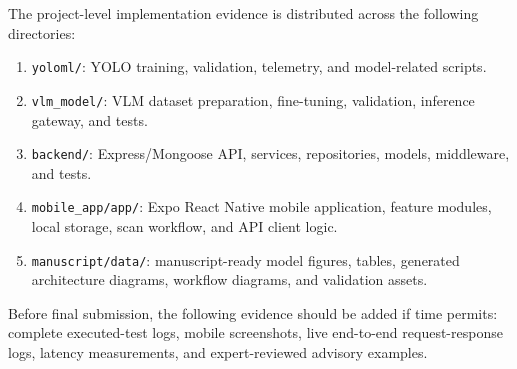 The project-level implementation evidence is distributed across the following directories:

\begin{enumerate}[label=\arabic*.]
\item \texttt{yoloml/}: YOLO training, validation, telemetry, and model-related scripts.
\item \texttt{vlm\_model/}: VLM dataset preparation, fine-tuning, validation, inference gateway,
and tests.
\item \texttt{backend/}: Express/Mongoose API, services, repositories, models, middleware, and
tests.
\item \texttt{mobile\_app/app/}: Expo React Native mobile application, feature modules, local
storage, scan workflow, and API client logic.
\item \texttt{manuscript/data/}: manuscript-ready model figures, tables, generated architecture
diagrams, workflow diagrams, and validation assets.
\end{enumerate}

Before final submission, the following evidence should be added if time permits: complete
executed-test logs, mobile screenshots, live end-to-end request-response logs, latency
measurements, and expert-reviewed advisory examples.
